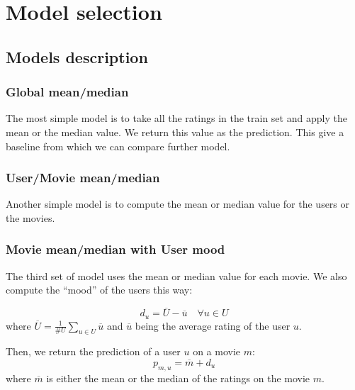\documentclass[10pt,conference,compsocconf]{IEEEtran}
\begin{document}
\section{Model selection}

\subsection{Models description}
\subsubsection{Global mean/median}

The most simple model is to take all the ratings in the train set and apply the mean or the median value. We return this value as the prediction. This give a baseline from which we can compare further model.

\subsubsection{User/Movie mean/median}

Another simple model is to compute the mean or median value for the users or the movies.

\subsubsection{Movie mean/median with User mood}

The third set of model uses the mean or median value for each movie. We also compute the ``mood'' of the users this way:

\begin{equation}
 d_u = \overline{U} - \overline{u} \quad \forall u\in U
\end{equation}
where $\overline{U} = \frac{1}{\#U} \sum_{u\in U} \overline{u}$ and $\overline{u}$ being the average rating of the user $u$.

Then, we return the prediction of a user $u$ on a movie $m$:
\begin{equation}
 p_{m,u} = \overline{m} + d_u
\end{equation}
where $\overline{m}$ is either the mean or the median of the ratings on the movie $m$.
\end{document}
